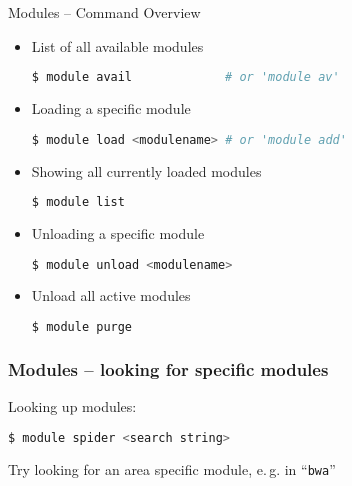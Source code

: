 \begin{frame}[fragile]
  {Modules -- Command Overview}
  \vspace{-1em}
  \begin{itemize}
    \setlength\itemsep{-0.1em}
  \item List of all available modules
    \begin{lstlisting}[language=Bash, style=Shell]
$ module avail             # or 'module av'
    \end{lstlisting}
  \item Loading a specific module
    \begin{lstlisting}[language=Bash, style=Shell]
$ module load <modulename> # or 'module add'
    \end{lstlisting}
  \item Showing all currently loaded modules
    \begin{lstlisting}[language=Bash, style=Shell]
$ module list
    \end{lstlisting}
  \item Unloading a specific module
    \begin{lstlisting}[language=Bash, style=Shell]
$ module unload <modulename>
    \end{lstlisting}
  \item Unload all active modules
    \begin{lstlisting}[language=Bash, style=Shell]
$ module purge
    \end{lstlisting}
  \end{itemize}
  \vfill
\end{frame}

\begin{frame}[fragile]
  \frametitle{Modules -- looking for specific modules}
  Looking up modules:
  \begin{lstlisting}[language=Bash, style=Shell]
$ module spider <search string>
  \end{lstlisting}
  \pause
  \begin{task}
  	Try looking for an area specific 
    module, e.\,g. in ``\texttt{bwa}''
  \end{task}
\end{frame}

